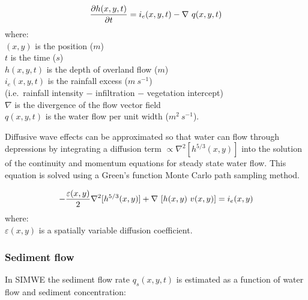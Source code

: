 \documentclass[esurf, manuscript]{copernicus}
\begin{document}
\begin{equation}
\label{eq:water}
{\partial h(x,y,t) \over \partial t} =
 i_e(x,y,t) - \nabla ~ q(x,y,t)
\end{equation}
%
{\small
\noindent
where: \\
\noindent
\hspace*{0.5em} $(x,y)$ is the position ($m$)\\
\hspace*{0.5em} $t$ is the time ($s$) \\
\hspace*{0.5em} $h(x,y,t)$ is the depth of overland flow ($m$)\\
\hspace*{0.5em} $i_e(x,y,t)$ is the rainfall excess ($m~s^{-1}$) \\
\hspace*{0.5em} (i.e.~rainfall intensity $-$ infiltration $-$ vegetation intercept)\\
\hspace*{0.5em} $\nabla$ is the divergence of the flow vector field\\
\hspace*{0.5em} $q(x,y,t)$ is the water flow per unit width ($m^2~s^{-1}$). \\
}

Diffusive wave effects can be approximated
so that water can flow through depressions 
by integrating a diffusion term $ \propto \nabla^2 [h^{5/3}(x,y)]$ 
into the solution of the continuity and momentum equations 
for steady state water flow.
This equation is solved using a 
Green's function Monte Carlo path sampling method. 

\begin{equation}
\label{eq:difwater}
-{\varepsilon(x,y)\over 2 }\nabla^2 [h^{5/3}(x,y)]
+\nabla ~ [ h(x,y)~v(x,y)] = i_e(x,y)
\end{equation}
%
{\small
\noindent
 where: \\
 \noindent
 \hspace*{0.5em} $\varepsilon(x,y)$ is a spatially variable diffusion coefficient. \\
}

\subsubsection{Sediment flow}
In SIMWE the sediment flow rate $q_s(x,y,t)$ is estimated 
as a function of water flow and sediment concentration:
\end{document}
